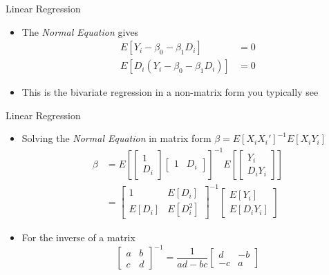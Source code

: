 \documentclass[aspectratio=1610,12pt,xcolor=dvipsnames]{beamer}
\begin{document}
\begin{frame}{Linear Regression}

\begin{itemize}
    \item The \textit{Normal Equation} gives
    \begin{align*}
        E[Y_i - \beta_0 - \beta_1D_i] &= 0 \\
        E[D_i(Y_i - \beta_0 - \beta_1D_i)] &= 0
    \end{align*}
    \item This is the bivariate regression in a non-matrix form you typically see
    \end{itemize}
\end{frame}

\begin{frame}{Linear Regression}

\begin{itemize}
    \item Solving the \textit{Normal Equation} in matrix form $\beta = E[X_iX_i']^{-1}E[X_iY_i]$
    \begin{align*}
    \beta &= E\left[\begin{bmatrix}
    1 \\ D_{i}
    \end{bmatrix} \begin{bmatrix}
    1 & D_{i}
    \end{bmatrix} \right]^{-1} E\left[ \begin{bmatrix}
    Y_i \\ D_{i} Y_i
    \end{bmatrix} \right] \\
    &=
    \begin{bmatrix}
    1 & E[D_i] \\
    E[D_i] & E[D_i^2]
    \end{bmatrix}^{-1}
\begin{bmatrix}
E[Y_i] \\ E[D_i Y_i]
\end{bmatrix}
    \end{align*}
    \item For the inverse of a matrix
    \[
\begin{bmatrix}
a & b \\
c & d
\end{bmatrix}^{-1}
=
\frac{1}{ad-bc}
\begin{bmatrix}
d & -b \\
-c & a
\end{bmatrix}
\]
\end{itemize}
\end{frame}
\end{document}
